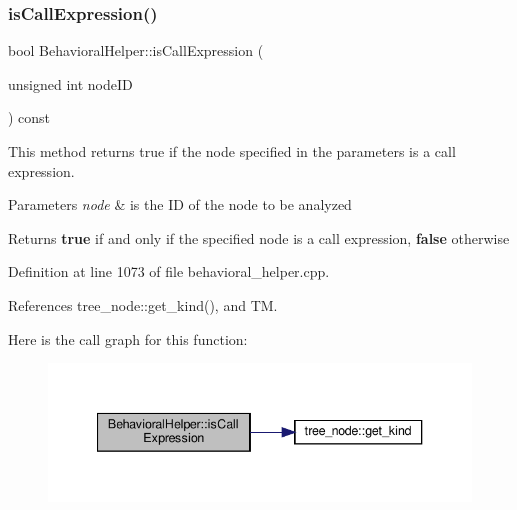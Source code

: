 \subsubsection{\texorpdfstring{is\+Call\+Expression()}{isCallExpression()}}
{\footnotesize\ttfamily bool Behavioral\+Helper\+::is\+Call\+Expression (\begin{DoxyParamCaption}\item[{unsigned int}]{node\+ID }\end{DoxyParamCaption}) const\hspace{0.3cm}{\ttfamily [virtual]}}



This method returns true if the node specified in the parameters is a call expression. 


\begin{DoxyParams}{Parameters}
{\em node} & is the ID of the node to be analyzed \\
\hline
\end{DoxyParams}
\begin{DoxyReturn}{Returns}
{\bfseries true} if and only if the specified node is a call expression, {\bfseries false} otherwise 
\end{DoxyReturn}


Definition at line 1073 of file behavioral\+\_\+helper.\+cpp.



References tree\+\_\+node\+::get\+\_\+kind(), and TM.

Here is the call graph for this function\+:
\nopagebreak
\begin{figure}[H]
\begin{center}
\leavevmode
\includegraphics[width=340pt]{dd/db2/classBehavioralHelper_a486a12168fcbe079b7963cb5053e089e_cgraph}
\end{center}
\end{figure}
\mbox{\label{classBehavioralHelper_ab3cf7f144e14b8297d4f596ff8f54f90}} 

